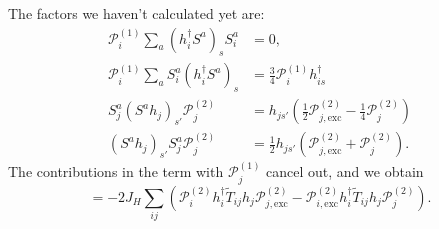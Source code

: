 \documentclass[11pt, a4paper]{article}
\begin{document}
The factors we haven't calculated yet are:
\begin{align}
\mathcal{P}_i^{(1)} \sum_a (h_i^{\dagger} S^a)_s S_i^a &= 0, \label{eq:A27} \\
\mathcal{P}_i^{(1)} \sum_a S_i^a (h_i^{\dagger} S^a)_s &= \frac{3}{4} \mathcal{P}_i^{(1)} h_{is}^{\dagger} \label{eq:A28} \\
S_j^a (S^a h_j)_{s'} \mathcal{P}_j^{(2)} &= h_{js'} \left( \frac{1}{2} \mathcal{P}_{j, \text{exc}}^{(2)} - \frac{1}{4} \mathcal{P}_j^{(2)} \right) \label{eq:A29} \\
(S^a h_j)_{s'} S_j^a \mathcal{P}_j^{(2)} &= \frac{1}{2} h_{js'} (\mathcal{P}_{j, \text{exc}}^{(2)} + \mathcal{P}_j^{(2)}). \label{eq:A30}
\end{align}
The contributions in the term with $\mathcal{P}_j^{(1)}$ cancel out, and we obtain
\begin{equation}
[V_S, T_0] = -2J_H \sum_{ij} \left( \mathcal{P}_i^{(2)} h_i^{\dagger} \tilde{T}_{ij} h_j \mathcal{P}_{j, \text{exc}}^{(2)} - \mathcal{P}_{i, \text{exc}}^{(2)} h_i^{\dagger} \tilde{T}_{ij} h_j \mathcal{P}_j^{(2)} \right). \label{eq:A31}
\end{equation}
\end{document}
